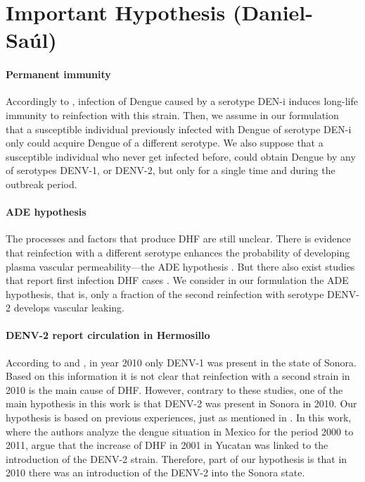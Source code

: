 \section*{Important Hypothesis (Daniel-Saúl)}
    \paragraph{Permanent immunity}
    Accordingly to \cite{WHO}, infection of Dengue caused by a serotype DEN-i
    induces long-life immunity to reinfection with this strain. Then, we
    assume in our formulation that a susceptible individual previously
    infected with Dengue of serotype DEN-i only could acquire Dengue of a 
    different serotype.  We also suppose that a susceptible individual who 
    never get infected before, could obtain Dengue by any of serotypes 
    DENV-1, or DENV-2, but only for a single time and during the outbreak 
    period.
%
    \paragraph{ADE hypothesis}
    The processes and factors that produce \ac{DHF} are still unclear. There is 
    evidence that reinfection with a different serotype enhances the probability 
    of developing plasma vascular permeability---the \ac{ADE} hypothesis 
    \citep[see, e.g.][p. 295]{Halstead1992}. 
    But there also exist studies that report first infection DHF cases 
    \cite{Debast1993}. We consider in our formulation the ADE hypothesis, that 
    is, only a fraction of the second reinfection with serotype \ac{DENV-2} 
    develops vascular leaking.
%
    \paragraph{\ac{DENV-2} report circulation in Hermosillo}
        
        According to \cite{Vazquez2011} and \cite{Reyes2017}, in year 2010 only DENV-1 
        was present in the state of Sonora. Based on this information 
        it is not clear that reinfection with a second 
        strain in 2010 is the main cause of DHF. 
        However, contrary to these studies, one of the main 
        hypothesis in this work is that DENV-2 was present in Sonora in 2010. 
        Our hypothesis is based on previous experiences, just as mentioned in 
        \cite{Gomez2014}. In this work, where the authors analyze the dengue situation in Mexico for the period 2000 to 2011, argue that the increase of DHF in 2001 in 
        Yucatan was linked to the introduction of the DENV-2 strain. 
        Therefore, part of our hypothesis is that in 2010 there was an 
        introduction of the DENV-2 into the Sonora state. 


